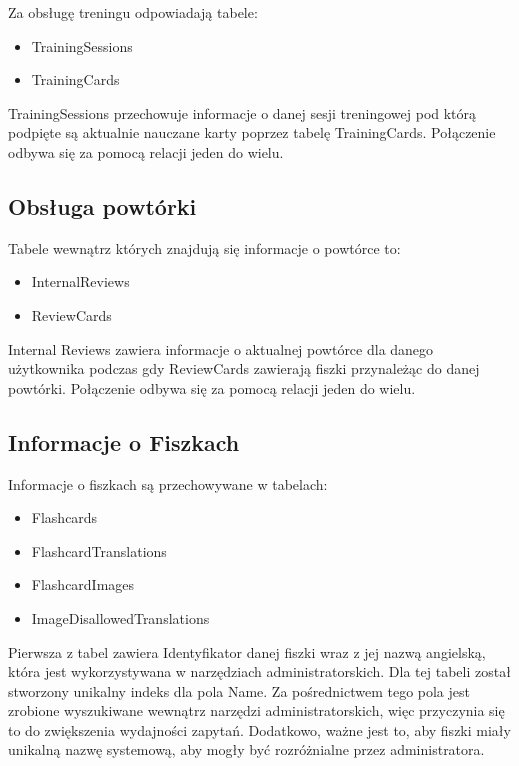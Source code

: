 Za obsługę treningu odpowiadają tabele:

\begin{itemize}
	\item TrainingSessions
	\item TrainingCards
\end{itemize}

TrainingSessions przechowuje informacje o danej sesji treningowej pod którą podpięte są aktualnie nauczane karty poprzez tabelę TrainingCards. Połączenie odbywa się za pomocą relacji jeden do wielu.

\subsection{Obsługa powtórki}

Tabele wewnątrz których znajdują się informacje o powtórce to:

\begin{itemize}
	\item InternalReviews
	\item ReviewCards
\end{itemize}

Internal Reviews zawiera informacje o aktualnej powtórce dla danego użytkownika podczas gdy ReviewCards zawierają fiszki przynależąc do danej powtórki. Połączenie odbywa się za pomocą relacji jeden do wielu.

\subsection{Informacje o Fiszkach}

Informacje o fiszkach są przechowywane w tabelach:

\begin{itemize}
	\item Flashcards
	\item FlashcardTranslations
	\item FlashcardImages
	\item ImageDisallowedTranslations
\end{itemize}

Pierwsza z tabel zawiera Identyfikator danej fiszki wraz z jej nazwą angielską, która jest wykorzystywana w narzędziach administratorskich. Dla tej tabeli został stworzony unikalny indeks dla pola Name. Za pośrednictwem tego pola jest zrobione wyszukiwane wewnątrz narzędzi administratorskich, więc przyczynia się to do zwiększenia wydajności zapytań. Dodatkowo, ważne jest to, aby fiszki miały unikalną nazwę systemową, aby mogły być rozróżnialne przez administratora.

